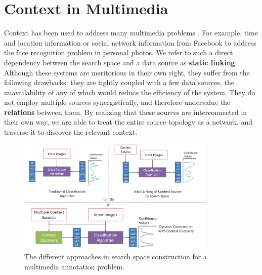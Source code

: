 \section{Context in Multimedia}

Context has been used to address many multimedia problems \cite{henter2012tag, li2012fusing, naaman2005identity, o2009context,stone2008autotagging}. For example, time and location information or social network information from Facebook to address the face recognition problem in personal photos. We refer to such a direct dependency between the search space and a data source as \textbf{static linking}. Although these systems are meritorious in their own right, they suffer from the following drawbacks: they are tightly coupled with a few data sources, the unavailability of any of which would reduce the efficiency of the system. They do not employ multiple sources synergistically, and therefore undervalue the \textbf{relations} between them. By realizing that these sources are interconnected in their own way, we are able to treat the entire source topology as a network, and traverse it to discover the relevant context.

\begin{figure}[t]
\centering
\includegraphics[width=0.85\textwidth]{media/with-without-cuenet-2.png}
\caption{The different approaches in search space construction for a multimedia annotation problem.}
\label{fig:with-without-cuenet-1}
\end{figure}

